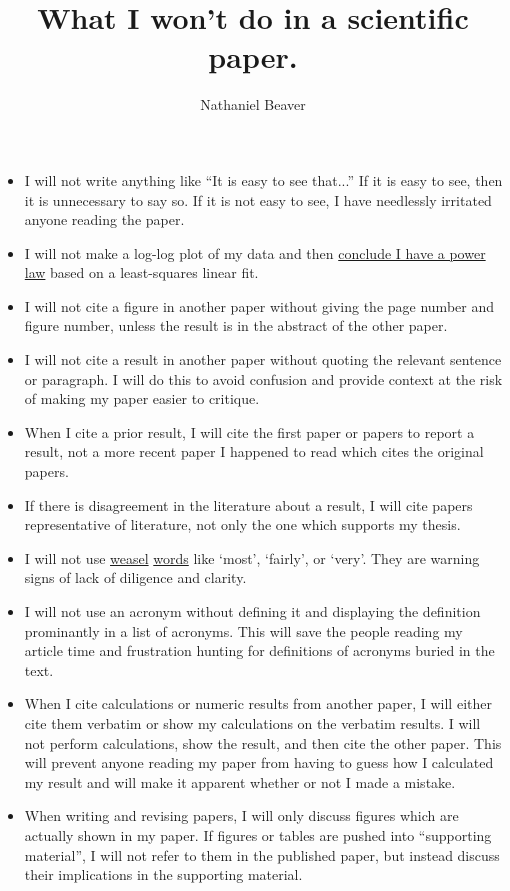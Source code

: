 \documentclass[12pt,letterpaper]{article}
\author{Nathaniel Beaver}
\title{What I won't do in a scientific paper.}
\begin{document}
\maketitle

\begin{itemize}
\item I will not write anything like ``It is easy to see that...'' If it is easy to see, then it is unnecessary to say so. If it is not easy to see, I have needlessly irritated anyone reading the paper.
\item I will not make a log-log plot of my data and then \href{http://vserver1.cscs.lsa.umich.edu/~crshalizi/notebooks/power-laws.html}{conclude I have a power law} based on a least-squares linear fit. 
\item I will not cite a figure in another paper without giving the page number and figure number, unless the result is in the abstract of the other paper.
\item I will not cite a result in another paper without quoting the relevant sentence or paragraph. I will do this to avoid confusion and provide context at the risk of making my paper easier to critique.
\item When I cite a prior result, I will cite the first paper or papers to report a result, not a more recent paper I happened to read which cites the original papers.
\item If there is disagreement in the literature about a result, I will cite papers representative of literature, not only the one which supports my thesis.
\item I will not use \href{http://matt.might.net/articles/shell-scripts-for-passive-voice-weasel-words-duplicates/}{weasel} \href{http://en.wikipedia.org/wiki/Weasel_words}{words} like `most', `fairly', or `very'. They are warning signs of lack of diligence and clarity.
\item I will not use an acronym without defining it and displaying the definition prominantly in a list of acronyms. This will save the people reading my article time and frustration hunting for definitions of acronyms buried in the text.
\item When I cite calculations or numeric results from another paper, I will either cite them verbatim or show my calculations on the verbatim results. I will not perform calculations, show the result, and then cite the other paper. This will prevent anyone reading my paper from having to guess how I calculated my result and will make it apparent whether or not I made a mistake.
\item When writing and revising papers, I will only discuss figures which are actually shown in my paper. If figures or tables are pushed into ``supporting material'', I will not refer to them in the published paper, but instead discuss their implications in the supporting material.
\end{itemize}
\end{document}

